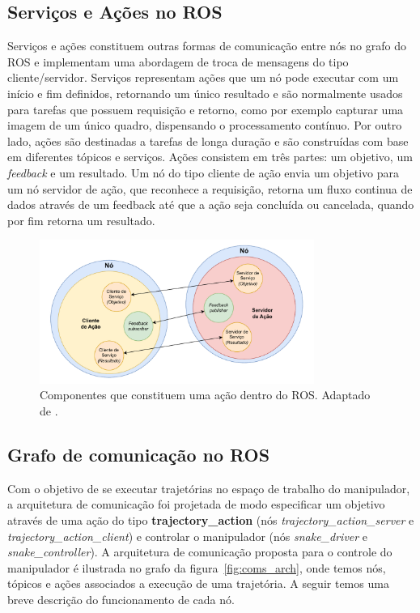 \subsection*{Serviços e Ações no ROS}

Serviços e ações constituem outras formas de comunicação entre nós no grafo do
ROS e implementam uma abordagem de troca de mensagens do tipo cliente/servidor.
Serviços representam ações que um nó pode executar com um início e fim
definidos, retornando um único resultado e são normalmente usados para tarefas
que possuem requisição e retorno, como por exemplo capturar uma imagem de um
único quadro, dispensando o processamento contínuo. Por outro lado, ações são
destinadas a tarefas de longa duração e são construídas com base em diferentes
tópicos e serviços. Ações consistem em três partes: um objetivo, um
\emph{feedback} e um resultado. Um nó do tipo cliente de ação envia um objetivo
para um nó servidor de ação, que reconhece a requisição, retorna um fluxo
continua de dados através de um feedback até que a ação seja concluída ou
cancelada, quando por fim retorna um resultado.

\begin{figure}
	\centering
	\includegraphics[width=0.8\textwidth]{./Images/ros-action.pdf}
	\caption{Componentes que constituem uma ação dentro do ROS. Adaptado de \cite[p. 36]{bassa_very_2023}.}\label{fig:ros-action}
\end{figure}

\subsection*{Grafo de comunicação no ROS}

Com o objetivo de se executar trajetórias no espaço de trabalho do manipulador,
a arquitetura de comunicação foi projetada de modo especificar um objetivo
através de uma ação do tipo \textbf{trajectory\_action} (nós
\emph{trajectory\_action\_server} e \emph{trajectory\_action\_client}) e
controlar o manipulador (nós \emph{snake\_driver} e \emph{snake\_controller}).
A arquitetura de comunicação proposta para o controle do manipulador é
ilustrada no grafo da figura~\ref{fig:coms_arch}, onde temos nós, tópicos e
ações associados a execução de uma trajetória. A seguir temos uma breve
descrição do funcionamento de cada nó.

